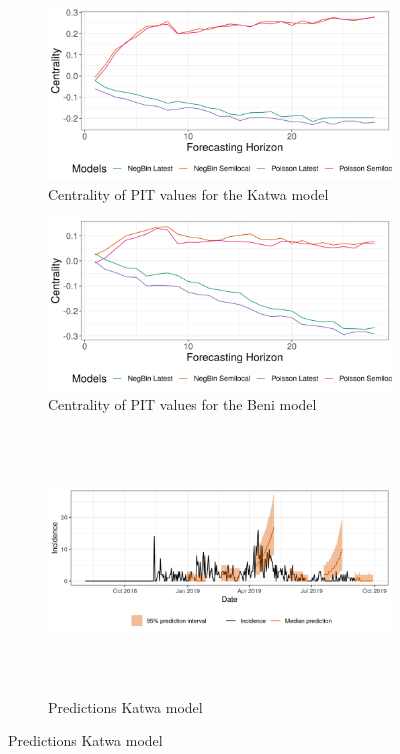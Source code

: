\documentclass[12pt]{article}
\begin{document}
\begin{figure}[h!]
\begin{subfigure}{0.5\textwidth}
  \centering
  \includegraphics[width=\linewidth, ]{../output/Katwa_centrality.png}  
  \caption{Centrality of PIT values for the Katwa model}
  \label{fig:beni_katwa_1}
\end{subfigure}
\begin{subfigure}{0.5\textwidth}
  \centering
  \includegraphics[width=\linewidth]{../output/Beni_centrality.png}  
  \caption{Centrality of PIT values for the Beni model}
  \label{fig:beni_katwa_2}
\end{subfigure}

\begin{subfigure}{\textwidth}
  \centering
  \includegraphics[width=0.9\linewidth, height=7cm]{../output/Katwa_predictions.png}  
  \caption{Predictions Katwa model}
  \label{fig:beni_katwa_3}
\end{subfigure}


\end{figure}
\end{document}

